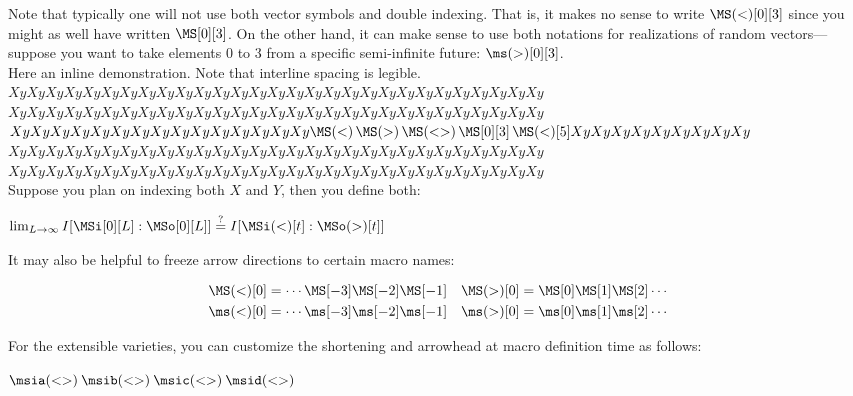 \documentclass{article}
\begin{document}
Note that typically one will not use both vector symbols and double indexing.
That is, it makes no sense to write $\MS(<)[0][3]$ since you might as well have
written $\MS[0][3]$.  On the other hand, it can make sense to use both
notations for realizations of random vectors---suppose you want to take elements $0$ to $3$ from
a specific semi-infinite future: $\ms(>)[0][3]$.\\

Here an inline demonstration. Note that interline spacing is legible.\\

$XyXyXyXyXyXyXyXyXyXyXyXyXyXyXyXyXyXyXyXyXyXyXyXyXyXyXyXyXy$\\
$XyXyXyXyXyXyXyXyXyXyXyXyXyXyXyXyXyXyXyXyXyXyXyXyXyXyXyXyXy$\\
$XyXyXyXyXyXyXyXyXyXyXyXyXyXyXy%
\MS(<) \, \MS(>) \, \MS(<>) \, \MS[0][3] \, \MS(<)[5]%
XyXyXyXyXyXyXyXyXy$
\\
$XyXyXyXyXyXyXyXyXyXyXyXyXyXyXyXyXyXyXyXyXyXyXyXyXyXyXyXyXy$\\
$XyXyXyXyXyXyXyXyXyXyXyXyXyXyXyXyXyXyXyXyXyXyXyXyXyXyXyXyXy$\\[.2in]

Suppose you plan on indexing both $X$ and $Y$, then you define both:
\begin{LTXexample}[pos=b]
$\lim_{L \to \infty} I[ \MSi[0][L] : \MSo[0][L] ] \stackrel{?}{=} I[ \MSi(<)[t] : \MSo(>)[t]]$
\end{LTXexample}\vspace{.1in}

It may also be helpful to freeze arrow directions to certain macro names:
\begin{LTXexample}[pos=b]
\newcommand{\Past}{\MS(<)}
\newcommand{\past}{\ms(<)}
\newcommand{\Future}{\MS(>)}
\newcommand{\future}{\ms(>)}
\begin{align*}
  \Past[0]   &= \cdots \MS[-3] \MS[-2] \MS[-1] &
  \Future[0] &= \MS[0] \MS[1]  \MS[2]  \cdots \\
  \past[0]   &= \cdots \ms[-3] \ms[-2] \ms[-1] &
  \future[0] &= \ms[0] \ms[1]  \ms[2]  \cdots \\
\end{align*}
\end{LTXexample}

For the extensible varieties, you can customize the shortening and arrowhead
at macro definition time as follows:
\begin{LTXexample}[pos=b]
$\msia(<>) \: \msib(<>) \: \msic(<>) \: \msid(<>)$
\end{LTXexample}
\end{document}
